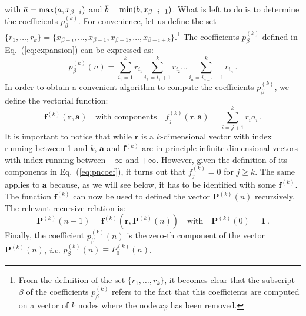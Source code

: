 \documentclass[10pt,a4paper]{article}
\begin{document}
with $\overline{a} = {\rm max}(a,x_{\beta-i})$ and
$\overline{b} = {\rm min}(b,x_{\beta-i+1})$.
What is left to do is to determine the coefficients
$p_{\beta}^{(k)}$. For convenience, let us define the set
$\{r_1,\dots,r_k\}=\{x_{\beta-i},\dots,x_{\beta-1},x_{\beta+1},\dots,x_{\beta-i+k}\}$.\footnote{From
  the definition of the set $\{r_1,\dots,r_k\}$, it becomes clear that
  the subscript $\beta$ of the coefficients $p_{\beta}^{(k)}$ refers
  to the fact that this coefficients are computed on a vector of $k$
  nodes where the node $x_{\beta}$ has been removed.} The coefficients
$p_{\beta}^{(k)}$ defined in Eq.~(\ref{eq:expansion}) can be expressed
as:
\begin{equation}\label{eq:pncoef}
  p_{\beta}^{(k)}(n)=\sum_{i_1=1}^k r_{i_1}\sum_{i_2=i_1+1}^k r_{i_2}\dots\sum_{i_n=i_{n-1}+1}^k r_{i_n}\,.
\end{equation}
In order to obtain a convenient algorithm to compute the coefficients
$p_{\beta}^{(k)}$, we define the vectorial function:
\begin{equation}
\mathbf{f}^{(k)}(\mathbf{r},\mathbf{a})\quad\mbox{with components}\quad  f_j^{(k)}\left(\mathbf{r},\mathbf{a}\right)=\sum_{i=j+1}^k r_{i}a_{i}\,.
\end{equation}
It is important to notice that while $\mathbf{r}$ is a $k$-dimensional
vector with index running between 1 and $k$, $\mathbf{a}$ and
$\mathbf{f}^{(k)}$ are in principle infinite-dimensional vectors with
index running between $-\infty$ and $+\infty$.  However, given the
definition of its components in Eq.~(\ref{eq:pncoef}), it turns out
that $f_j^{(k)}=0$ for $j\geq k$. The same applies to $\mathbf{a}$
because, as we will see below, it has to be identified with some
$\mathbf{f}^{(k)}$.  The function $\mathbf{f}^{(k)}$ can now be used
to defined the vector $\mathbf{P}^{(k)}(n)$ recursively. The relevant
recursive relation is:
\begin{equation}
\mathbf{P}^{(k)}(n+1) = \mathbf{f}^{(k)}(\mathbf{r},\mathbf{P}^{(k)}(n))\quad\mbox{with}\quad\mathbf{P}^{(k)}(0) = \mathbf{1}\,.
\end{equation}
Finally, the coefficient $p_{\beta}^{(k)}(n)$ is the zero-th
component of the vector $\mathbf{P}^{(k)}(n)$, \textit{i.e.}
$p_{\beta}^{(k)}(n)\equiv P_0^{(k)}(n)$.
\end{document}
